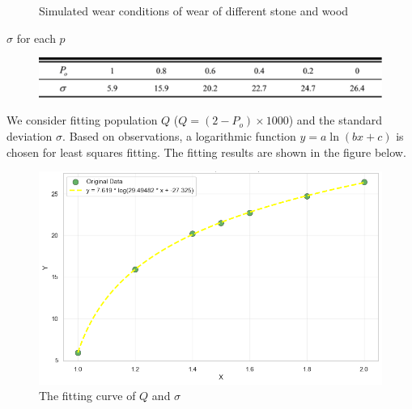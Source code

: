 \documentclass[12pt]{article}  %
\numberwithin{equation}{section} %
\begin{document}
\begin{figure}[H]
	\caption{Simulated wear conditions of wear of different stone and wood}		%
	\label{fig:666}									%
    \vspace{-1.0em}
\end{figure}

\begin{table}[H]
    \centering
    \vspace{-0.5em}
    \caption{$\sigma$ for each $p$}
    \vspace{-1.0em}
        \begin{figure}[H]
    	\centering
    	\includegraphics[width=0.8\linewidth]{psigma2.png}
        \end{figure}
    \label{psigma}
    \vspace{-1.5em}
\end{table}
We consider fitting population $Q$ ($Q = (2-P_o)\times 1000$) and the standard deviation $\sigma$. Based on observations, a logarithmic function $y=a\ln{(bx+c)}$ is chosen for least squares fitting. The fitting results are shown in the figure below.

\begin{figure}[H]
\vspace{-1em}
	\centering
\includegraphics[width=0.5\linewidth]{nihe.png}
	\caption{The fitting curve of $Q$ and $\sigma$}
	\label{nihe}
 \vspace{-1em}
\end{figure}
\end{document}

